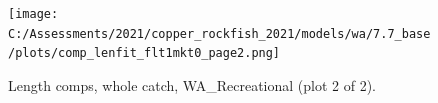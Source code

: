 \documentclass[11pt,
  english,
  a4paper,
]{article}
\begin{document}
\tagmcend\tagstructend


\begin{figure}
\centering
\texttt{[image: C:/Assessments/2021/copper\_rockfish\_2021/models/wa/7.7\_base/plots/comp\_lenfit\_flt1mkt0\_page2.png]}
\caption{Length comps, whole catch, WA\_Recreational (plot 2 of 2).\label{fig:comp_lenfit_flt1mkt0_page2}}
\end{figure}

\tagmcend\tagstructend
\end{document}
